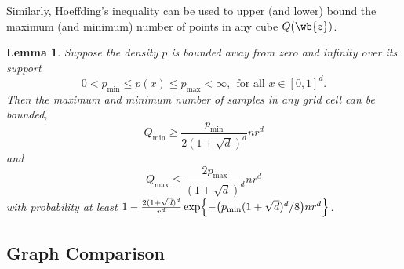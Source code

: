 \documentclass{article}
\newcommand{\1}{\mathbf{1}}
\theoremstyle{alden}
\theoremstyle{aldenthm}
\newtheorem{lemma}{Lemma}
\theoremstyle{definition}
\theoremstyle{remark}
\begin{document}
Similarly, Hoeffding's inequality can be used to upper (and lower) bound the maximum (and minimum) number of points in any cube $Q(\wb{z})$. 
\begin{lemma}
	\label{lem:hoeffding_box}
	Suppose the density $p$ is bounded away from zero and infinity over its support
	\begin{equation*}
	0 < p_{\min} \leq p(x) \leq p_{\max} < \infty,~~\textrm{for all $x \in [0,1]^d$.}
	\end{equation*}
	Then the maximum and minimum number of samples in any grid cell can be bounded,
	\begin{equation*}
	Q_{\min} \geq \frac{p_{\min}}{2 (1 + \sqrt{d})^d} n r^d
	\end{equation*}
	and
	\begin{equation*}
	Q_{\max} \leq \frac{2 p_{\max}}{(1 + \sqrt{d})^d} n r^d
	\end{equation*} 
	with probability at least $1 - \frac{2(1 + \sqrt{d})^d}{r^d} \exp\Bigl\{-\bigl(p_{\min} (1 + \sqrt{d})^d/8 \bigr)nr^d \Bigr\}$. 
\end{lemma}

\subsection{Graph Comparison}
\end{document}

